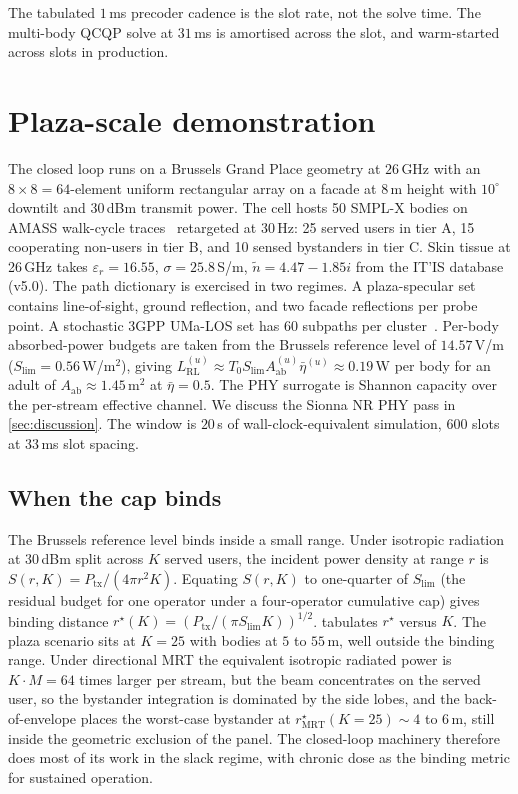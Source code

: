 \documentclass[journal,twocolumn,10pt]{IEEEtran}
\theoremstyle{plain}
\theoremstyle{remark}
\newcommand{\Aab}{A_{\mathrm{ab}}}
\newcommand{\ntilde}{\tilde{n}}
\begin{document}
The tabulated $1\,$ms precoder cadence is the slot rate, not the
solve time. The multi-body QCQP solve at $31\,$ms is amortised
across the slot, and warm-started across slots in production.


\section{Plaza-scale demonstration}\label{sec:eval}

The closed loop runs on a Brussels Grand Place geometry at $26\,$GHz
with an $8 \times 8 = 64$-element uniform rectangular array on a
facade at $8\,$m height with $10^\circ$ downtilt and $30\,$dBm
transmit power. The cell hosts 50 SMPL-X bodies on AMASS walk-cycle
traces~\cite{SMPL,SMPLX,AMASS} retargeted at $30\,$Hz: 25 served
users in tier A, 15 cooperating non-users in tier B, and 10 sensed
bystanders in tier C. Skin tissue at 26\,GHz takes
$\varepsilon_r = 16.55$, $\sigma = 25.8\,$S/m,
$\ntilde = 4.47 - 1.85i$ from the IT'IS database (v5.0). The path
dictionary is exercised in two regimes. A plaza-specular set
contains line-of-sight, ground reflection, and two facade reflections
per probe point. A stochastic 3GPP UMa-LOS set has 60 subpaths per
cluster~\cite{TR38901}. Per-body absorbed-power budgets are taken
from the Brussels reference level of $14.57\,$V/m
($S_{\mathrm{lim}} = 0.56\,$W/m$^2$), giving
$L^{(u)}_{\mathrm{RL}} \approx T_0 S_{\mathrm{lim}}
\Aab^{(u)}\bar\eta^{(u)} \approx 0.19\,$W per body for an adult of
$\Aab \approx 1.45\,$m$^2$ at $\bar\eta = 0.5$. The PHY surrogate is
Shannon capacity over the per-stream effective channel. We discuss
the Sionna NR PHY pass in \cref{sec:discussion}. The window is $20\,$s
of wall-clock-equivalent simulation, $600$ slots at $33\,$ms slot
spacing.

\subsection{When the cap binds}\label{sec:eval-binding}

The Brussels reference level binds inside a small range. Under
isotropic radiation at $30\,$dBm split across $K$ served users, the
incident power density at range $r$ is $S(r, K) = P_{\mathrm{tx}}/(4
\pi r^2 K)$. Equating $S(r, K)$ to one-quarter of $S_{\mathrm{lim}}$
(the residual budget for one operator under a four-operator
cumulative cap) gives binding distance
$r^\star(K) = (P_{\mathrm{tx}}/(\pi S_{\mathrm{lim}} K))^{1/2}$.
 tabulates $r^\star$ versus $K$. The plaza scenario
sits at $K = 25$ with bodies at $5$ to $55\,$m, well outside the
binding range. Under directional MRT the equivalent isotropic
radiated power is $K \cdot M = 64$ times larger per stream, but the
beam concentrates on the served user, so the bystander integration
is dominated by the side lobes, and the back-of-envelope places the
worst-case bystander at $r^\star_{\mathrm{MRT}}(K=25)
\sim 4$ to $6\,$m, still inside the geometric exclusion of the
panel. The closed-loop machinery therefore does most of its work in
the slack regime, with chronic dose as the binding metric for
sustained operation.
\end{document}
